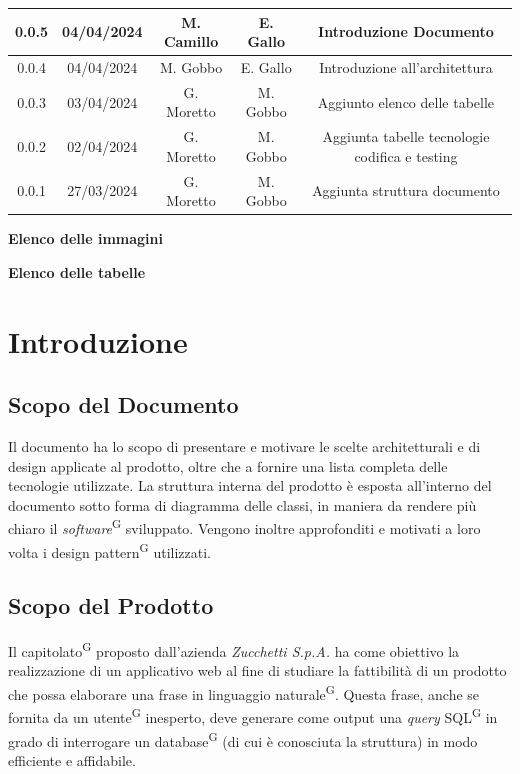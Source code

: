 \documentclass[5pt]{article}
\begin{document}
\begin{table}[H]
{\begin{tabular}{|c|c|c|c|c|}
    			\hline
				0.0.5 & 04/04/2024 & M. Camillo & E. Gallo & Introduzione Documento \\
                \hline
				0.0.4 & 04/04/2024 & M. Gobbo & E. Gallo & Introduzione all'architettura \\
				\hline
				0.0.3 & 03/04/2024 & G. Moretto & M. Gobbo & Aggiunto elenco delle tabelle \\
				\hline
				0.0.2 & 02/04/2024 & G. Moretto & M. Gobbo & Aggiunta tabelle tecnologie codifica e testing \\
				\hline
				0.0.1 & 27/03/2024 & G. Moretto & M. Gobbo & Aggiunta struttura documento \\
				\hline
			\end{tabular}
		}
		\label{tab:conference}
	\end{table}
	
	\pagebreak
	\tableofcontents
	\pagebreak
	\textbf{\Large Elenco delle immagini} \\
	\makeatletter
	\makeatother
	
	\pagebreak
	\textbf{\Large Elenco delle tabelle} \\
	\makeatletter
	\makeatother
	\pagebreak
	
	\section{Introduzione}
	
	\subsection{Scopo del Documento}

    Il documento ha lo scopo di presentare e motivare le scelte architetturali e di design applicate al prodotto, oltre che a fornire una lista completa delle tecnologie utilizzate. La struttura interna del prodotto è esposta all'interno del documento sotto forma di diagramma delle classi, in maniera da rendere più chiaro il \textit{software}\textsuperscript{G} sviluppato. Vengono inoltre approfonditi e motivati a loro volta i design pattern\textsuperscript{G} utilizzati. 
	
	\subsection{Scopo del Prodotto}
    Il capitolato\textsuperscript{G} proposto dall'azienda \textit{Zucchetti S.p.A.} ha come obiettivo la realizzazione di un applicativo web al fine di studiare la fattibilità di un prodotto che possa elaborare una frase in linguaggio naturale\textsuperscript{G}. Questa frase, anche se fornita da un utente\textsuperscript{G} inesperto, deve generare come output una \textit{query} SQL\textsuperscript{G} in grado di interrogare un database\textsuperscript{G} (di cui è conosciuta la struttura) in modo efficiente e affidabile.
	
\end{document}
